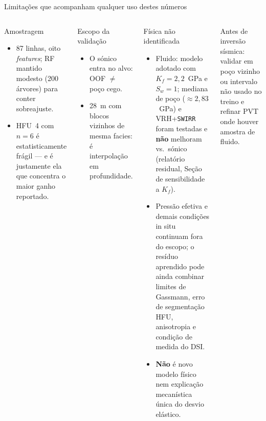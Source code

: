 \documentclass[aspectratio=169,10pt]{beamer}
\begin{document}
\begin{frame}{Limitações que acompanham qualquer uso destes números}
  \footnotesize
  \vspace{0.04cm}
  \begin{columns}[T,onlytextwidth]
    \begin{block}{Amostragem}
      \scriptsize
      \begin{itemize}
        \item 87 linhas, oito \emph{features}; RF mantido modesto
              (200 árvores) para conter sobreajuste.
        \item HFU~4 com $n=6$ é estatisticamente frágil --- e é justamente ela
              que concentra o maior ganho reportado.
      \end{itemize}
    \end{block}
    \begin{block}{Escopo da validação}
      \scriptsize
      \begin{itemize}
        \item O sónico entra no alvo: OOF $\neq$ poço cego.
        \item 28~m com blocos vizinhos de mesma facies: é interpolação em
              profundidade.
      \end{itemize}
    \end{block}
    \begin{exampleblock}{Física não identificada}
      \scriptsize
      \begin{itemize}
        \item Fluido: modelo adotado com $K_f=2{,}2$~GPa e $S_w=1$; mediana de
              poço ($\approx 2{,}83$~GPa) e VRH+\texttt{SWIRR} foram
              testadas e \textbf{não} melhoram vs.\ sónico
              (relatório residual, Seção de sensibilidade a $K_f$).
        \item Pressão efetiva e demais condições in situ continuam fora
              do escopo; o resíduo aprendido pode ainda combinar limites de
              Gassmann, erro de segmentação HFU, anisotropia e condição de
              medida do DSI.
        \item \textbf{Não} é novo modelo físico nem explicação mecanística
              única do desvio elástico.
      \end{itemize}
    \end{exampleblock}
    \vspace{0.04cm}
    {\scriptsize Antes de inversão sísmica: validar em poço vizinho ou
    intervalo não usado no treino e refinar PVT onde houver amostra de fluido.}
  \end{columns}
\end{frame}
\end{document}
